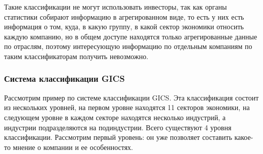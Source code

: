 \documentclass{article}
\begin{document}
	Такие классификации не могут использовать инвесторы, так как органы статистики собирают информацию в агрегированном виде, то есть у них есть информация о том, куда, в какую группу, в какой сектор экономики относить каждую компанию, но в общем доступе находятся только агрегированные данные по отраслям, поэтому интересующую информацию по отдельным компаниям по таким классификаторам получить невозможно.
	
	\subsubsection{Система классификации GICS}
	
	Рассмотрим пример по системе классификации GICS.
	Эта классификация состоит из нескольких уровней, на первом уровне находятся 11 секторов экономики, на следующем уровне в каждом секторе находятся несколько индустрий, а индустрии подразделяются на подиндустрии. Всего существуют 4 уровня классификации. Рассмотрим первый уровень: он уже позволяет составить какое-то мнение о компании и ее особенностях.
	
\end{document}
